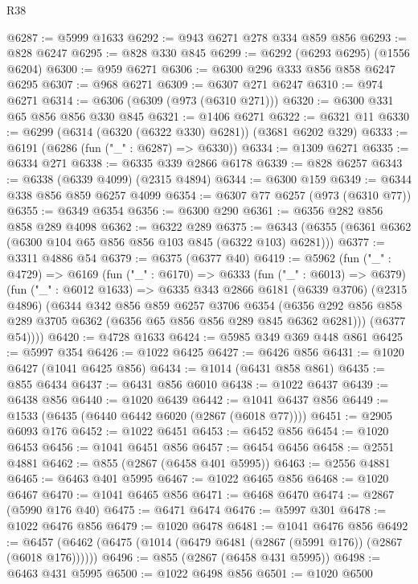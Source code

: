\begin{lexlean}{R38}
\begin{coremodule}
@6287 := @5999 @1633
@6292 := @943 @6271 @278 @334 @859 @856
@6293 := @828 @6247
@6295 := @828 @330 @845
@6299 := @6292 (@6293 @6295) (@1556 @6204)
@6300 := @959 @6271
@6306 := @6300 @296 @333 @856 @858 @6247 @6295
@6307 := @968 @6271
@6309 := @6307 @271 @6247
@6310 := @974 @6271
@6314 := @6306 (@6309 (@973 (@6310 @271)))
@6320 := @6300 @331 @65 @856 @856 @330 @845
@6321 := @1406 @6271
@6322 := @6321 @11
@6330 := @6299 (@6314 (@6320 (@6322 @330) @6281)) (@3681 @6202 @329)
@6333 := @6191 (@6286 (fun ("_" : @6287) => @6330))
@6334 := @1309 @6271
@6335 := @6334 @271
@6338 := @6335 @339 @2866 @6178
@6339 := @828 @6257
@6343 := @6338 (@6339 @4099) (@2315 @4894)
@6344 := @6300 @159
@6349 := @6344 @338 @856 @859 @6257 @4099
@6354 := @6307 @77 @6257 (@973 (@6310 @77))
@6355 := @6349 @6354
@6356 := @6300 @290
@6361 := @6356 @282 @856 @858 @289 @4098
@6362 := @6322 @289
@6375 := @6343 (@6355 (@6361 @6362 (@6300 @104 @65 @856 @856 @103 @845 (@6322 @103) @6281)))
@6377 := @3311 @4886 @54
@6379 := @6375 (@6377 @40)
@6419 := @5962
    (fun ("_" : @4729) =>
    @6169
      (fun ("_" : @6170) =>
      @6333
        (fun ("_" : @6013) => @6379)
        (fun ("_" : @6012 @1633) =>
        @6335
          @343
          @2866
          @6181
          (@6339 @3706)
          (@2315 @4896)
          (@6344
            @342
            @856
            @859
            @6257
            @3706
            @6354
            (@6356 @292 @856 @858 @289 @3705 @6362 (@6356 @65 @856 @856 @289 @845 @6362 @6281)))
          (@6377 @54))))
@6420 := @4728 @1633
@6424 := @5985 @349 @369 @448 @861
@6425 := @5997 @354
@6426 := @1022 @6425
@6427 := @6426 @856
@6431 := @1020 @6427 (@1041 @6425 @856)
@6434 := @1014 (@6431 @858 @861)
@6435 := @855 @6434
@6437 := @6431 @856 @6010
@6438 := @1022 @6437
@6439 := @6438 @856
@6440 := @1020 @6439
@6442 := @1041 @6437 @856
@6449 := @1533 (@6435 (@6440 @6442 @6020 (@2867 (@6018 @77))))
@6451 := @2905 @6093 @176
@6452 := @1022 @6451
@6453 := @6452 @856
@6454 := @1020 @6453
@6456 := @1041 @6451 @856
@6457 := @6454 @6456
@6458 := @2551 @4881
@6462 := @855 (@2867 (@6458 @401 @5995))
@6463 := @2556 @4881
@6465 := @6463 @401 @5995
@6467 := @1022 @6465 @856
@6468 := @1020 @6467
@6470 := @1041 @6465 @856
@6471 := @6468 @6470
@6474 := @2867 (@5990 @176 @40)
@6475 := @6471 @6474
@6476 := @5997 @301
@6478 := @1022 @6476 @856
@6479 := @1020 @6478
@6481 := @1041 @6476 @856
@6492 := @6457 (@6462 (@6475 (@1014 (@6479 @6481 (@2867 (@5991 @176)) (@2867 (@6018 @176))))))
@6496 := @855 (@2867 (@6458 @431 @5995))
@6498 := @6463 @431 @5995
@6500 := @1022 @6498 @856
@6501 := @1020 @6500

\end{coremodule}
\end{lexlean}
